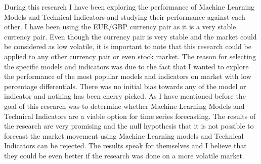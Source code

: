 \documentclass{imc-inf}
\begin{document}
	
	During this research I have been exploring the performance of Machine Learning Models and Technical Indicators and studying their performance against each other. I have been using the EUR/GBP currency pair as it is a very stable currency pair.
	Even though the currency pair is very stable and the market could be considered as low volatile, it is important to note that this research could be applied to any other currency pair or even stock market.
	The reason for selecting the specific models and indicators was due to the fact that I wanted to explore the performance of the most popular models and indicators on market with low percentage differentials.
	There was no initial bias towards any of the model or indicator and nothing has been cherry picked. As I have mentioned before the goal of this research was to determine whether Machine Learning Models 
	and Technical Indicators are a viable option for time series forecasting. The results of the research are very promising and the null hypothesis that it is not possible to forecast the market movement using Machine Learning models
	and Technical Indicators can be rejected. The results speak for themselves and I believe that they could be even better if the research was done on a more volatile market.
	
	
	
	
	
	\backmatter%
	
	\typeout{}
	
	
\end{document}
